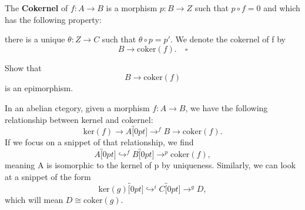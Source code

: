 \documentclass[../category_theory.tex]{subfiles}
\begin{document}
\begin{def*}
	The \textbf{Cokernel} of \(f:A\rightarrow B\) is a morphism \(p:B\rightarrow Z\) such that \(p\circ f=0 \) and which has the following property:
	\begin{center}
	\end{center}
	there is a unique \(\theta:Z\rightarrow C\) such that \(\theta \circ p = p'\). We denote the cokernel of f by
	\[
		B\rightarrow \mathrm{coker}(f).\quad \square
	\]
\end{def*}
\begin{exr}
	Show that
	\[
		B\rightarrow \mathrm{coker}(f)
	\]
	is an epimorphism.
\end{exr}
In an abelian ctegory, given a morphism \(f:A\rightarrow B\), we have the following relationship between kernel and cokernel:
\[
	\mathrm{ker}(f)\rightarrow A\overbracket[0pt]{\rightarrow}^{f}B\rightarrow \mathrm{coker}(f).
\]
If we focus on a snippet of that relationship, we find
\[
	A\overbracket[0pt]{\hookrightarrow}^{f}B\overbracket[0pt]{\rightarrow}^{p}\mathrm{coker}(f),
\]
meaning A is isomorphic to the kernel of p by uniqueness. Similarly, we can look at a snippet of the form
\[
	\mathrm{ker}(g)\overbracket[0pt]{\hookrightarrow}^{i}C\overbracket[0pt]{\rightarrow}^{g}D,
\]
which will mean \(D\cong \mathrm{coker}(g)\).
\end{document}
